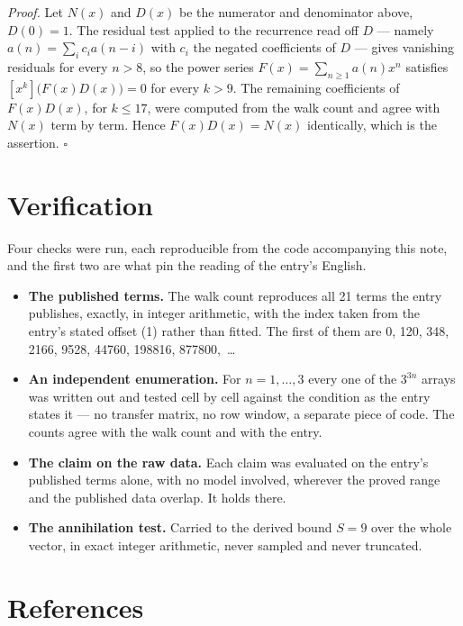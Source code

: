 \documentclass[11pt]{article}
\theoremstyle{definition}
\begin{document}
{\itshape Proof.} Let $N(x)$ and $D(x)$ be the numerator and denominator above, $D(0)=1$. The residual test applied to the recurrence read off $D$ --- namely $a(n) = \sum_i c_i a(n-i)$ with $c_i$ the negated coefficients of $D$ --- gives vanishing residuals for every $n > 8$, so the power series $F(x)=\sum_{n\ge 1}a(n)x^n$ satisfies $[x^k]\bigl(F(x)D(x)\bigr) = 0$ for every $k > 9$. The remaining coefficients of $F(x)D(x)$, for $k \le 17$, were computed from the walk count and agree with $N(x)$ term by term. Hence $F(x)D(x) = N(x)$ identically, which is the assertion. $\square$

\section{Verification}

Four checks were run, each reproducible from the code accompanying this note, and the first two are what pin the reading of the entry's English.

\begin{itemize}

\item {\bfseries The published terms.} The walk count reproduces all 21 terms the entry publishes, exactly, in integer arithmetic, with the index taken from the entry's stated offset (1) rather than fitted. The first of them are 0, 120, 348, 2166, 9528, 44760, 198816, 877800,~\dots

\item {\bfseries An independent enumeration.} For $n = 1,\dots,3$ every one of the $3^{3n}$ arrays was written out and tested cell by cell against the condition as the entry states it --- no transfer matrix, no row window, a separate piece of code. The counts agree with the walk count and with the entry.

\item {\bfseries The claim on the raw data.} Each claim was evaluated on the entry's published terms alone, with no model involved, wherever the proved range and the published data overlap. It holds there.

\item {\bfseries The annihilation test.} Carried to the derived bound $S = 9$ over the whole vector, in exact integer arithmetic, never sampled and never truncated.

\end{itemize}

\section{References}
\end{document}
